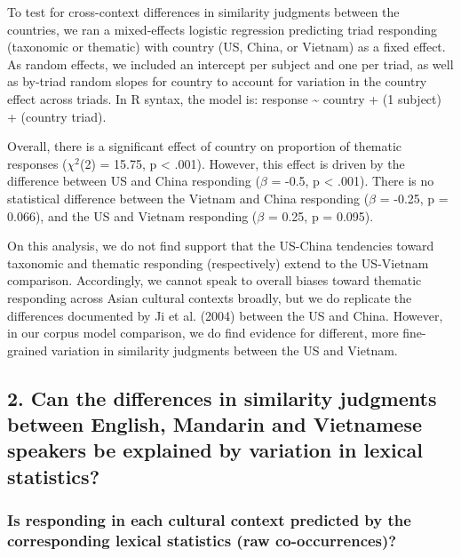 \documentclass[10pt, letterpaper]{article}
\begin{document}
To test for cross-context differences in similarity judgments between
the countries, we ran a mixed-effects logistic regression predicting
triad responding (taxonomic or thematic) with country (US, China, or
Vietnam) as a fixed effect. As random effects, we included an intercept
per subject and one per triad, as well as by-triad random slopes for
country to account for variation in the country effect across triads. In
R syntax, the model is: response \textasciitilde{} country + (1
\textbar{} subject) + (country \textbar{} triad).

Overall, there is a significant effect of country on proportion of
thematic responses (\(\chi^2\)(2) = 15.75, p \textless{} .001). However,
this effect is driven by the difference between US and China responding
(\(\beta\) = -0.5, p \textless{} .001). There is no statistical
difference between the Vietnam and China responding (\(\beta\) = -0.25,
p = 0.066), and the US and Vietnam responding (\(\beta\) = 0.25, p =
0.095).

On this analysis, we do not find support that the US-China tendencies
toward taxonomic and thematic responding (respectively) extend to the
US-Vietnam comparison. Accordingly, we cannot speak to overall biases
toward thematic responding across Asian cultural contexts broadly, but
we do replicate the differences documented by Ji et al. (2004) between
the US and China. However, in our corpus model comparison, we do find
evidence for different, more fine-grained variation in similarity
judgments between the US and Vietnam.

\hypertarget{can-the-differences-in-similarity-judgments-between-english-mandarin-and-vietnamese-speakers-be-explained-by-variation-in-lexical-statistics}{%
\subsection{2. Can the differences in similarity judgments between
English, Mandarin and Vietnamese speakers be explained by variation in
lexical
statistics?}\label{can-the-differences-in-similarity-judgments-between-english-mandarin-and-vietnamese-speakers-be-explained-by-variation-in-lexical-statistics}}

\hypertarget{is-responding-in-each-cultural-context-predicted-by-the-corresponding-lexical-statistics-raw-co-occurrences}{%
\subsubsection{Is responding in each cultural context predicted by the
corresponding lexical statistics (raw
co-occurrences)?}\label{is-responding-in-each-cultural-context-predicted-by-the-corresponding-lexical-statistics-raw-co-occurrences}}
\end{document}
